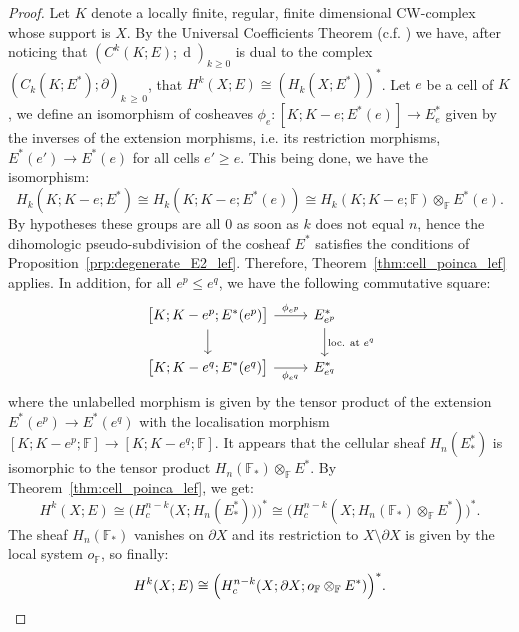 \documentclass[AHL,Unicode,longabstracts,published]{cedram}
\newcommand{\F}{\mathbb{F}}
\DeclareMathOperator{\df}{d}
\begin{document}
\begin{proof}
Let $K$ denote a locally finite, regular, finite dimensional CW-complex whose support is $X$. By the Universal Coefficients Theorem (c.f. \cite[Theorem~3.3 p.~113]{Car-Eil_hom_alg}) 
we have, after noticing that $(C^k(K;E);\df)_{k\geq 0}$ is dual to the complex $(C_k(K;E^*);\partial)_{k\,\geq\,0}$, that $H^k(X;E)\cong(H_k(X;E^*))^*$. Let $e$ be a cell of $K$, we define an isomorphism of cosheaves $\phi_e:[K;K-e;E^*(e)]\rightarrow E^*_e$ given by the inverses of the extension morphisms, i.e. its restriction morphisms, $E^*(e')\rightarrow E^*(e)$ for all cells $e'\geq e$. This being done, we have the isomorphism:
\begin{equation*}
H_k(K;K-e;E^*)\cong H_k(K;K-e;E^*(e)) \cong H_k(K;K-e;\F)\otimes_\F E^*(e).
\end{equation*}
By hypotheses these groups are all $0$ as soon as $k$ does not equal $n$, hence the dihomologic pseudo-subdivision of the cosheaf $E^*$ satisfies the conditions of Proposition~\ref{prp:degenerate_E2_lef}. Therefore, Theorem~\ref{thm:cell_poinca_lef} applies. In addition, for all $e^p\leq e^q$, we have the following commutative square:
\begin{equation*}
\begin{tikzcd}
\big[K;K-e^p;E^*(e^p)\big]\arrow[d] \arrow[r,"\phi_{e^p}"] & E^*_{e^p} \arrow[d,"\text{loc. at }e^q" right] \\%
\big[K;K-e^q;E^*(e^q)\big]\arrow[r,"\phi_{e^q}" below] & E^*_{e^q}
\end{tikzcd}
\end{equation*}
where the unlabelled morphism is given by the tensor product of the extension $E^*(e^p)\rightarrow E^*(e^q)$ with the localisation morphism $[K;K-e^p;\F]\rightarrow [K;K-e^q;\F]$. It appears that the cellular sheaf $H_n(E^*_*)$ is isomorphic to the tensor product ${H_n(\F_*)\otimes_\F E^*}$. By Theorem~\ref{thm:cell_poinca_lef}, we get:
\begin{equation*}
H^k(X;E)\cong \Big(H^{n-k}_c\big(X;H_n(E^*_*)\big)\Big)^* \cong \Big(H^{n-k}_c(X; H_n(\F_*)\otimes_\F E^*)\Big)^*.
\end{equation*}
The sheaf $H_n(\F_*)$ vanishes on $\partial X$ and its restriction to $X\setminus \partial X$ is given by the local system $o_\F$, so finally:
\begin{equation*}
H^k(X;E) \cong \Big(H^{n-k}_c(X;\partial X; o_\F\otimes_\F E^*)\Big)^*.\qedhere
\end{equation*}
\end{proof}
\end{document}
